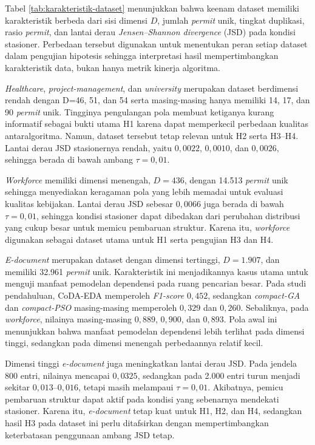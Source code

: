 Tabel \ref{tab:karakteristik-dataset} menunjukkan bahwa keenam dataset memiliki karakteristik berbeda dari sisi dimensi $D$, jumlah \textit{permit} unik, tingkat duplikasi, rasio \textit{permit}, dan lantai derau \textit{Jensen–Shannon divergence} (JSD) pada kondisi stasioner. 
Perbedaan tersebut digunakan untuk menentukan peran setiap dataset dalam pengujian hipotesis sehingga interpretasi hasil mempertimbangkan karakteristik data, bukan hanya metrik kinerja algoritma.

\textit{Healthcare}, \textit{project-management}, dan \textit{university} merupakan dataset berdimensi rendah dengan D=46, 51, dan 54 serta masing-masing hanya memiliki 14, 17, dan 90 \textit{permit} unik. 
Tingginya pengulangan pola membuat ketiganya kurang informatif sebagai bukti utama H1 karena dapat memperkecil perbedaan kualitas antaralgoritma. 
Namun, dataset tersebut tetap relevan untuk H2 serta H3–H4. 
Lantai derau JSD stasionernya rendah, yaitu $0,0022$, $0,0010$, dan $0,0026$, sehingga berada di bawah ambang $\tau=0{,}01$.

\textit{Workforce} memiliki dimensi menengah, $D=436$, dengan 14.513 \textit{permit} unik sehingga menyediakan keragaman pola yang lebih memadai untuk evaluasi kualitas kebijakan. 
Lantai derau JSD sebesar $0,0066$ juga berada di bawah $\tau=0{,}01$, sehingga kondisi stasioner dapat dibedakan dari perubahan distribusi yang cukup besar untuk memicu pembaruan struktur. 
Karena itu, \textit{workforce} digunakan sebagai dataset utama untuk H1 serta pengujian H3 dan H4.

\textit{E-document} merupakan dataset dengan dimensi tertinggi, $D=1.907$, dan memiliki 32.961 \textit{permit} unik. 
Karakteristik ini menjadikannya kasus utama untuk menguji manfaat pemodelan dependensi pada ruang pencarian besar. 
Pada studi pendahuluan, CoDA-EDA memperoleh \textit{F1-score} $0,452$, sedangkan \textit{compact-GA} dan \textit{compact-PSO} masing-masing memperoleh $0,329$ dan $0,260$. 
Sebaliknya, pada \textit{workforce}, nilainya masing-masing $0,889$, $0,900$, dan $0,893$. 
Pola awal ini menunjukkan bahwa manfaat pemodelan dependensi lebih terlihat pada dimensi tinggi, sedangkan pada dimensi menengah perbedaannya relatif kecil.

Dimensi tinggi \textit{e-document} juga meningkatkan lantai derau JSD. 
Pada jendela 800 entri, nilainya mencapai $0,0325$, sedangkan pada 2.000 entri turun menjadi sekitar $0,013$–$0,016$, tetapi masih melampaui $\tau=0{,}01$. 
Akibatnya, pemicu pembaruan struktur dapat aktif pada kondisi yang sebenarnya mendekati stasioner. 
Karena itu, \textit{e-document} tetap kuat untuk H1, H2, dan H4, sedangkan hasil H3 pada dataset ini perlu ditafsirkan dengan mempertimbangkan keterbatasan penggunaan ambang JSD tetap.


